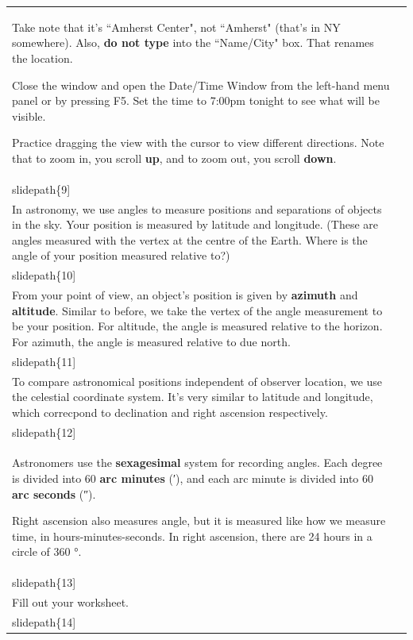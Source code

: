 \documentclass[12pt]{article}
\begin{document}
\begin{longtable}{|m{}|m{}|}
Take note that it's ``Amherst Center", not ``Amherst" (that's in NY somewhere). Also, \textbf{do not type} into the ``Name/City" box. That renames the location.

Close the window and open the Date/Time Window from the left-hand menu panel or by pressing F5. Set the time to 7:00pm tonight to see what will be visible.

Practice dragging the view with the cursor to view different directions. Note that to zoom in, you scroll \textbf{up}, and to zoom out, you scroll \textbf{down}. & \texttt{[image: \\slidepath\{9]}}\\\hline
In astronomy, we use angles to measure positions and separations of objects in the sky. Your position is measured by latitude and longitude. (These are angles measured with the vertex at the centre of the Earth. Where is the angle of your position measured relative to?) & \texttt{[image: \\slidepath\{10]}}\\\hline
From your point of view, an object's position is given by \textbf{azimuth} and \textbf{altitude}. Similar to before, we take the vertex of the angle measurement to be your position. For altitude, the angle is measured relative to the horizon. For azimuth, the angle is measured relative to due north. & \texttt{[image: \\slidepath\{11]}}\\\hline
To compare astronomical positions independent of observer location, we use the celestial coordinate system. It's very similar to latitude and longitude, which correcpond to declination and right ascension respectively. & \texttt{[image: \\slidepath\{12]}}\\\hline
Astronomers use the \textbf{sexagesimal} system for recording angles. Each degree is divided into 60 \textbf{arc minutes} (\si{\arcminute}), and each arc minute is divided into 60 \textbf{arc seconds} (\si{\arcsecond}).

Right ascension also measures angle, but it is measured like how we measure time, in hours-minutes-seconds. In right ascension, there are 24 hours in a circle of 360 \si{\degree}. & \texttt{[image: \\slidepath\{13]}}\\\hline
Fill out your worksheet. & \texttt{[image: \\slidepath\{14]}}\\\hline


\end{longtable}
\end{document}
